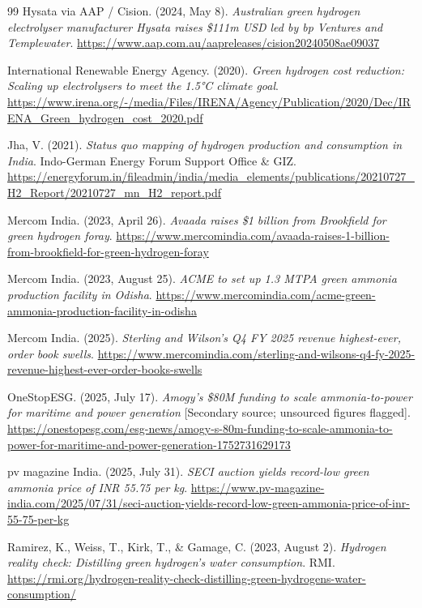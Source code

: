 {\begin{thebibliography}{99}
 Hysata via AAP / Cision. (2024, May 8). \emph{Australian green hydrogen electrolyser manufacturer Hysata raises \$111m USD led by bp Ventures and Templewater}. \url{https://www.aap.com.au/aapreleases/cision20240508ae09037}

 International Renewable Energy Agency. (2020). \emph{Green hydrogen cost reduction: Scaling up electrolysers to meet the 1.5°C climate goal}. \url{https://www.irena.org/-/media/Files/IRENA/Agency/Publication/2020/Dec/IRENA_Green_hydrogen_cost_2020.pdf}

 Jha, V. (2021). \emph{Status quo mapping of hydrogen production and consumption in India}. Indo-German Energy Forum Support Office \& GIZ. \url{https://energyforum.in/fileadmin/india/media_elements/publications/20210727_H2_Report/20210727_mn_H2_report.pdf}

 Mercom India. (2023, April 26). \emph{Avaada raises \$1 billion from Brookfield for green hydrogen foray}. \url{https://www.mercomindia.com/avaada-raises-1-billion-from-brookfield-for-green-hydrogen-foray}

 Mercom India. (2023, August 25). \emph{ACME to set up 1.3 MTPA green ammonia production facility in Odisha}. \url{https://www.mercomindia.com/acme-green-ammonia-production-facility-in-odisha}

 Mercom India. (2025). \emph{Sterling and Wilson's Q4 FY 2025 revenue highest-ever, order book swells}. \url{https://www.mercomindia.com/sterling-and-wilsons-q4-fy-2025-revenue-highest-ever-order-books-swells}

 OneStopESG. (2025, July 17). \emph{Amogy's \$80M funding to scale ammonia-to-power for maritime and power generation} [Secondary source; unsourced figures flagged]. \url{https://onestopesg.com/esg-news/amogy-s-80m-funding-to-scale-ammonia-to-power-for-maritime-and-power-generation-1752731629173}

 pv magazine India. (2025, July 31). \emph{SECI auction yields record-low green ammonia price of INR 55.75 per kg}. \url{https://www.pv-magazine-india.com/2025/07/31/seci-auction-yields-record-low-green-ammonia-price-of-inr-55-75-per-kg}

 Ramirez, K., Weiss, T., Kirk, T., \& Gamage, C. (2023, August 2). \emph{Hydrogen reality check: Distilling green hydrogen's water consumption}. RMI. \url{https://rmi.org/hydrogen-reality-check-distilling-green-hydrogens-water-consumption/}


\end{thebibliography}}
